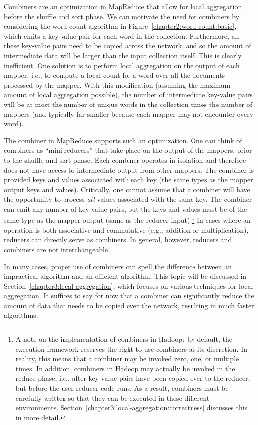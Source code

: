 Combiners are an optimization in MapReduce that allow for local
aggregation before the shuffle and sort phase.  We can motivate the
need for combiners by considering the word count algorithm in
Figure~\ref{chapter2:word-count:basic}, which emits a key-value pair
for each word in the collection.  Furthermore, all these key-value
pairs need to be copied across the network, and so the amount of
intermediate data will be larger than the input collection itself.
This is clearly inefficient.  One solution is to perform local
aggregation on the output of each mapper, i.e., to compute a local
count for a word over all the documents processed by the mapper.  With
this modification (assuming the maximum amount of local aggregation
possible), the number of intermediate key-value pairs will be at most
the number of unique words in the collection times the number of
mappers (and typically far smaller because each mapper may not
encounter every word).

The combiner in MapReduce supports such an optimization.  One can
think of combiners as ``mini-reducers'' that take place on the output
of the mappers, prior to the shuffle and sort phase.  Each combiner
operates in isolation and therefore does not have access to
intermediate output from other mappers.  The combiner is provided keys
and values associated with each key (the same types as the mapper
output keys and values).  Critically, one cannot assume that a
combiner will have the opportunity to process {\it all} values
associated with the same key.  The combiner can emit any number of
key-value pairs, but the keys and values must be of the same type as
the mapper output (same as the reducer input).\footnote{A note on the
implementation of combiners in Hadoop:\ by default, the execution
framework reserves the right to use combiners at its discretion.  In
reality, this means that a combiner may be invoked zero, one, or
multiple times.  In addition, combiners in Hadoop may actually be
invoked in the reduce phase, i.e., after key-value pairs have been
copied over to the reducer, but before the user reducer code runs.  As
a result, combiners must be carefully written so that they can be
executed in these different environments.
Section~\ref{chapter3:local-aggregation:correctness} discusses this in
more detail.}  In cases where an operation is both associative and
commutative (e.g., addition or multiplication), reducers can directly
serve as combiners.  In general, however, reducers and combiners are
not interchangeable.

In many cases, proper use of combiners can spell the difference
between an impractical algorithm and an efficient algorithm.  This
topic will be discussed in Section~\ref{chapter3:local-aggregation},
which focuses on various techniques for local aggregation.  It
suffices to say for now that a combiner can significantly reduce the
amount of data that needs to be copied over the network, resulting in
much faster algorithms.

